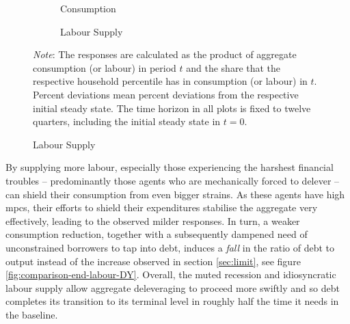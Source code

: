 \documentclass[a4paper,12pt]{article} %
\numberwithin{equation}{section} %
\numberwithin{figure}{section}
\numberwithin{table}{section}
\begin{document}
\begin{figure}[t]
    \centering
    \caption{Endogenous Labour Model -- Shock to Borrowing Limit: \\ Consumption and Labour Responses by Percentiles}
    \label{fig:end-L-permanent-limit-percentiles}
    \begin{subfigure}[b]{0.49\textwidth}
    \caption{Consumption}
    \label{fig:end-L-permanent-limit-percentiles-c}
         \centering
         
     \end{subfigure}
     \hfill
    \begin{subfigure}[b]{0.49\textwidth}
    \caption{Labour Supply}
    \label{fig:end-L-permanent-limit-percentiles-n}
         \centering
         
     \end{subfigure}
     
     \vspace{10pt}
     
     \justifying
     \footnotesize
	\textit{Note}: The responses are calculated as the product of aggregate consumption (or labour) in period $t$ and the share that the respective household percentile has in consumption (or labour) in $t$. Percent deviations mean percent deviations from the respective initial steady state. The time horizon in all plots is fixed to twelve quarters, including the initial steady state in $t=0$.
\end{figure}

By supplying more labour, especially those experiencing the harshest financial troubles -- predominantly those agents who are mechanically forced to delever -- can shield their consumption from even bigger strains. As these agents have high \Gls{mpc}s, their efforts to shield their expenditures stabilise the aggregate very effectively, leading to the observed milder responses. In turn, a weaker consumption reduction, together with a subsequently dampened need of unconstrained borrowers to tap into debt, induces a \textit{fall} in the ratio of debt to output instead of the increase observed in section \ref{sec:limit}, see figure \ref{fig:comparison-end-labour-DY}. Overall, the muted recession and idiosyncratic labour supply allow aggregate deleveraging to proceed more swiftly and so debt completes its transition to its terminal level in roughly half the time it needs in the baseline.
\end{document}
